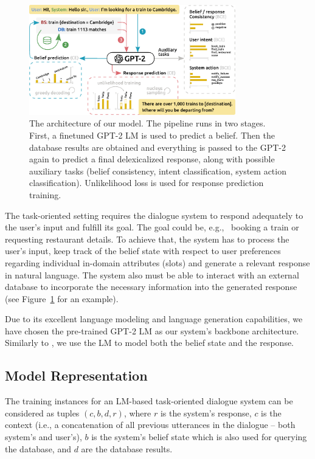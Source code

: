 \documentclass[11pt,a4paper]{article}
\newcommand{\augpt}[0]{our model\xspace}
\begin{document}
\begin{figure}[htbp]
\centering
\includegraphics[width=0.8\textwidth]{schema_v3} %
\caption{The architecture of \augpt. The pipeline runs in two stages. First, a finetuned GPT-2 LM is used to predict a belief. Then the database results are obtained and everything is passed to the GPT-2 again to predict a final delexicalized response, along with possible auxiliary tasks (belief consistency, intent classification, system action classification). Unlikelihood loss is used for response prediction training.}
\label{fig:pipeline}
\end{figure}

The task-oriented setting requires the dialogue system to respond adequately to the user's input and fulfill its goal. The goal could be, e.g., \ booking a train or requesting restaurant details. To achieve that, the system has to process the user's input, keep track of the belief state with respect to user preferences regarding individual in-domain attributes (slots) and generate a relevant response in natural language. The system also must be able to interact with an external database to incorporate the necessary information into the generated response (see Figure~\ref{fig:pipeline} for an example).

Due to its excellent language modeling and language generation capabilities, we have chosen the pre-trained GPT-2 LM as our system's backbone architecture. Similarly to \citet{budzianowski2019}, we use the LM to model both the belief state and the response.

\subsection{Model Representation}
\label{sec:model-repres}

The training instances for an LM-based task-oriented dialogue system can be considered as tuples $(c, b, d, r)$, where $r$ is the system's response, $c$ is the context (i.e., a concatenation of all previous utterances in the dialogue – both system's and user's), $b$ is the system's belief state which is also used for querying the database, and $d$ are the database results. 
\end{document}
